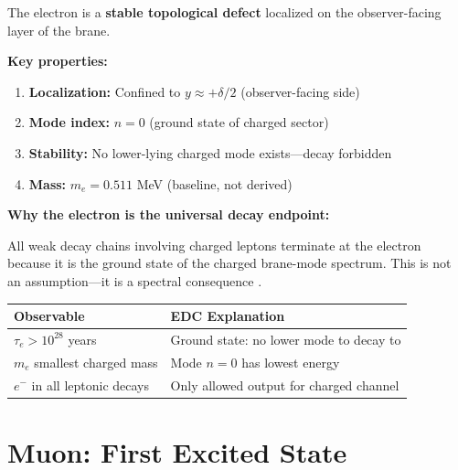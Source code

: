 \begin{tcolorbox}[colback=green!5!white, colframe=green!50!black,
    title=\textbf{Electron Ontology}]
The electron is a \textbf{stable topological defect} localized on the
observer-facing layer of the brane.

\textbf{Key properties:}
\begin{enumerate}[nosep]
    \item \textbf{Localization:} Confined to $y \approx +\delta/2$ (observer-facing side)
    \item \textbf{Mode index:} $n = 0$ (ground state of charged sector)
    \item \textbf{Stability:} No lower-lying charged mode exists---decay forbidden
    \item \textbf{Mass:} $m_e = 0.511$ MeV (baseline, not derived)
\end{enumerate}
\end{tcolorbox}

\textbf{Why the electron is the universal decay endpoint:}

All weak decay chains involving charged leptons terminate at the electron
because it is the ground state of the charged brane-mode spectrum. This is
not an assumption---it is a spectral consequence \tagDc{}.

\begin{center}
\begin{tabular}{ll}
\toprule
\textbf{Observable} & \textbf{EDC Explanation} \\
\midrule
$\tau_e > 10^{28}$ years & Ground state: no lower mode to decay to \\
$m_e$ smallest charged mass & Mode $n=0$ has lowest energy \\
$e^-$ in all leptonic decays & Only allowed output for charged channel \\
\bottomrule
\end{tabular}
\end{center}

\section{Muon: First Excited State}
\label{sec:muon}


